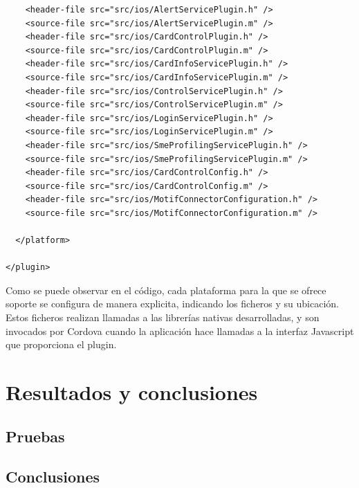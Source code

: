 \documentclass[a4paper, 12pt]{article}
\newenvironment{code}{\captionsetup{type=listing}}{}
\begin{document}
\begin{code}
\begin{verbatim}
    <header-file src="src/ios/AlertServicePlugin.h" />
    <source-file src="src/ios/AlertServicePlugin.m" />
    <header-file src="src/ios/CardControlPlugin.h" />
    <source-file src="src/ios/CardControlPlugin.m" />
    <header-file src="src/ios/CardInfoServicePlugin.h" />
    <source-file src="src/ios/CardInfoServicePlugin.m" />
    <header-file src="src/ios/ControlServicePlugin.h" />
    <source-file src="src/ios/ControlServicePlugin.m" />
    <header-file src="src/ios/LoginServicePlugin.h" />
    <source-file src="src/ios/LoginServicePlugin.m" />
    <header-file src="src/ios/SmeProfilingServicePlugin.h" />
    <source-file src="src/ios/SmeProfilingServicePlugin.m" />
    <header-file src="src/ios/CardControlConfig.h" />
    <source-file src="src/ios/CardControlConfig.m" />
    <header-file src="src/ios/MotifConnectorConfiguration.h" />
    <source-file src="src/ios/MotifConnectorConfiguration.m" />

  </platform>

</plugin>
\end{verbatim}
\end{code}
\bigbreak
Como se puede observar en el código, cada plataforma para la que se ofrece soporte se configura de manera explicita, indicando los ficheros y su ubicación. Estos ficheros realizan llamadas a las librerías
nativas desarrolladas, y son invocados por Cordova cuando la aplicación hace llamadas a la interfaz Javascript que proporciona el plugin.
\section{Resultados y conclusiones}
\label{sec-5}

\subsection{Pruebas}
\label{sec-5-1}

\subsection{Conclusiones}
\label{sec-5-2}

\printbibliography[heading=bibnumbered] %
\end{document}
